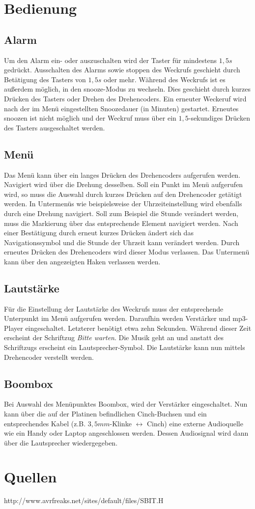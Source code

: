 \documentclass[journal, a4paper]{IEEEtran}
\begin{document}
\section{Bedienung}
\subsection{Alarm}
Um den Alarm ein- oder auszuschalten wird der Taster für mindestens $1,5s$ gedrückt. Ausschalten des Alarms sowie stoppen des Weckrufs geschieht durch Betätigung des Tasters von $1,5s$ oder mehr. Während des Weckrufs ist es außerdem möglich, in den snooze-Modus zu wechseln. Dies geschieht durch kurzes Drücken des Tasters oder Drehen des Drehencoders. Ein erneuter Weckeruf wird nach der im Menü eingestellten Snoozedauer (in Minuten) gestartet. Erneutes snoozen ist nicht möglich und der Weckruf muss über ein $1,5$-sekundiges Drücken des Tasters ausgeschaltet werden.
\subsection{Menü}
Das Menü kann über ein langes Drücken des Drehencoders aufgerufen werden. Navigiert wird über die Drehung desselben. Soll ein Punkt im Menü aufgerufen wird, so muss die Auswahl durch kurzes Drücken auf den Drehencoder getätigt werden. In Untermenüs wie beispielsweise der Uhrzeiteinstellung wird ebenfalls durch eine Drehung navigiert. Soll zum Beispiel die Stunde verändert werden, muss die Markierung über das entsprechende Element navigiert werden. Nach einer Bestätigung durch erneut kurzes Drücken ändert sich das Navigationssymbol und die Stunde der Uhrzeit kann verändert werden. Durch erneutes Drücken des Drehencoders wird dieser Modus verlassen. Das Untermenü kann über den angezeigten Haken verlassen werden.
\subsection{Lautstärke}
Für die Einstellung der Lautstärke des Weckrufs muss der entsprechende Unterpunkt im Menü aufgerufen werden. Daraufhin werden Verstärker und mp3-Player eingeschaltet. Letzterer benötigt etwa zehn Sekunden. Während dieser Zeit erscheint der Schriftzug \emph{\glqq Bitte warten\grqq}. Die Musik geht an und anstatt des Schriftzugs erscheint ein Lautsprecher-Symbol. Die Lautstärke kann nun mittels Drehencoder verstellt werden.
\subsection{Boombox}
Bei Auswahl des Menüpunktes Boombox, wird der Verstärker eingeschaltet. Nun kann über die auf der Platinen befindlichen Cinch-Buchsen und ein entsprechendes Kabel (z.B. $3,5mm$-Klinke $\leftrightarrow$ Cinch) eine externe Audioquelle wie ein Handy oder Laptop angeschlossen werden. Dessen Audiosignal wird dann über die Lautsprecher wiedergegeben.
\section{Quellen}
http://www.avrfreaks.net/sites/default/files/SBIT.H
\end{document}
